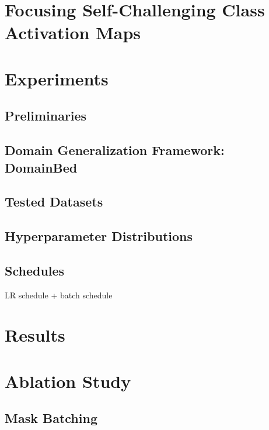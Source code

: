 \section{Focusing Self-Challenging Class Activation Maps}
\citet{Bae2020RethinkingCAM} \citet{sun2020fixing}


\section{Experiments}
\subsection{Preliminaries}
\subsection{Domain Generalization Framework: DomainBed}
\subsection{Tested Datasets}
\subsection{Hyperparameter Distributions}
\label{sec:ex_distributions}
\subsection{Schedules}
\label{sec:ex_schedules}
LR schedule + batch schedule

\section{Results}

\section{Ablation Study}

\subsection{Mask Batching}
\label{sec:ablation_study_batching}

